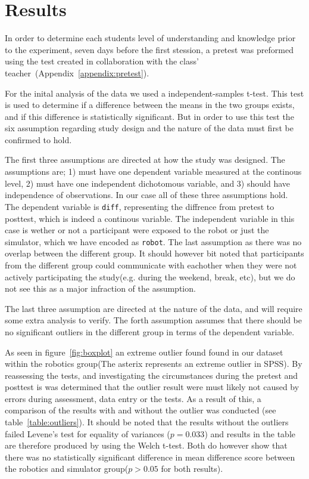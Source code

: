 \chapter{Results}
In order to determine each students level of understanding and knowledge prior to the experiment, seven days before the first stession, a pretest was preformed using the test created in collaboration with the class' teacher~(Appendix~\ref{appendix:pretest}).

\bigskip\noindent
For the inital analysis of the data we used a independent-samples t-test.
This test is used to determine if a difference between the means in the two groups exists, and if this difference is statistically significant.
But in order to use this test the six assumption regarding study design and the nature of the data must first be confirmed to hold.

\bigskip\noindent
The first three assumptions are directed at how the study was designed.
The assumptions are; 
1) must have one dependent variable measured at the continous level, 2) must have one independent dichotomous variable, and 3) should have independence of observations. In our case all of these three assumptions hold. The dependent variable is \texttt{diff}, representing the diffrence from pretest to posttest, which is indeed a continous variable. The independent variable in this case is wether or not a participant were exposed to the robot or just the simulator, which we have encoded as \texttt{robot}. The last assumption as there was no overlap between the different group. It should however bit noted that participants from the different group could communicate with eachother when they were not actively participating the study(e.g. during the weekend, break, etc), but we do not see this as a major infraction of the assumption.

\bigskip\noindent
The last three assumption are directed at the nature of the data, and will require some extra analysis to verify. The forth assumption assumes that there should be no significant outliers in the different group in terms of the dependent variable. 


\bigskip\noindent
As seen in figure~\ref{fig:boxplot} an extreme outlier found found in our dataset within the robotics group(The asterix represents an extreme outlier in SPSS). By reassessing the tests, and investigating the circumstances during the pretest and posttest is was determined that the outlier result were must likely not caused by errors during assessment, data entry or the tests. As a result of this, a comparison of the results with and without the outlier was conducted (see table~\ref{table:outliers}). It should be noted that the results without the outliers failed Levene's test for equality of variances ($p = 0.033$) and results in the table are therefore produced by using the Welch t-test. Both do however show that there was no statistically significant difference in mean difference score between the robotics and simulator group($p > 0.05$ for both results). 

